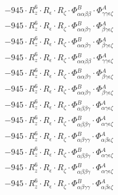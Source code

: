 \documentclass{article}
\begin{document}
\begin{subequations}
\begin{gather}
\begin{array}{c}
 \\[0.2em] 		 - 945 \cdot R_{z}^{6} \cdot R_{\epsilon{}} \cdot R_{\zeta{}} \cdot \Phi{}^{B}_{\alpha{}\alpha{}\beta{}\beta{}} \cdot \Phi{}^{A}_{\gamma{}\gamma{}\epsilon{}\zeta{}} 
 \\[0.2em] 		 - 945 \cdot R_{z}^{6} \cdot R_{\epsilon{}} \cdot R_{\zeta{}} \cdot \Phi{}^{B}_{\alpha{}\alpha{}\beta{}\gamma{}} \cdot \Phi{}^{A}_{\beta{}\gamma{}\epsilon{}\zeta{}} 
 \\[0.2em] 		 - 945 \cdot R_{z}^{6} \cdot R_{\epsilon{}} \cdot R_{\zeta{}} \cdot \Phi{}^{B}_{\alpha{}\alpha{}\beta{}\gamma{}} \cdot \Phi{}^{A}_{\beta{}\gamma{}\epsilon{}\zeta{}} 
 \\[0.2em] 		 - 945 \cdot R_{z}^{6} \cdot R_{\epsilon{}} \cdot R_{\zeta{}} \cdot \Phi{}^{B}_{\alpha{}\alpha{}\beta{}\beta{}} \cdot \Phi{}^{A}_{\gamma{}\gamma{}\epsilon{}\zeta{}} 
 \\[0.2em] 		 - 945 \cdot R_{z}^{6} \cdot R_{\epsilon{}} \cdot R_{\zeta{}} \cdot \Phi{}^{B}_{\alpha{}\alpha{}\beta{}\gamma{}} \cdot \Phi{}^{A}_{\beta{}\gamma{}\epsilon{}\zeta{}} 
 \\[0.2em] 		 - 945 \cdot R_{z}^{6} \cdot R_{\epsilon{}} \cdot R_{\zeta{}} \cdot \Phi{}^{B}_{\alpha{}\alpha{}\beta{}\gamma{}} \cdot \Phi{}^{A}_{\beta{}\gamma{}\epsilon{}\zeta{}} 
 \\[0.2em] 		 - 945 \cdot R_{z}^{6} \cdot R_{\epsilon{}} \cdot R_{\zeta{}} \cdot \Phi{}^{B}_{\alpha{}\beta{}\beta{}\gamma{}} \cdot \Phi{}^{A}_{\alpha{}\gamma{}\epsilon{}\zeta{}} 
 \\[0.2em] 		 - 945 \cdot R_{z}^{6} \cdot R_{\epsilon{}} \cdot R_{\zeta{}} \cdot \Phi{}^{B}_{\alpha{}\beta{}\beta{}\gamma{}} \cdot \Phi{}^{A}_{\alpha{}\gamma{}\epsilon{}\zeta{}} 
 \\[0.2em] 		 - 945 \cdot R_{z}^{6} \cdot R_{\epsilon{}} \cdot R_{\zeta{}} \cdot \Phi{}^{B}_{\alpha{}\beta{}\gamma{}\gamma{}} \cdot \Phi{}^{A}_{\alpha{}\beta{}\epsilon{}\zeta{}} 
 \\[0.2em] 		 - 945 \cdot R_{z}^{6} \cdot R_{\epsilon{}} \cdot R_{\zeta{}} \cdot \Phi{}^{B}_{\alpha{}\beta{}\beta{}\gamma{}} \cdot \Phi{}^{A}_{\alpha{}\gamma{}\epsilon{}\zeta{}} 
 \\[0.2em] 		 - 945 \cdot R_{z}^{6} \cdot R_{\epsilon{}} \cdot R_{\zeta{}} \cdot \Phi{}^{B}_{\alpha{}\beta{}\beta{}\gamma{}} \cdot \Phi{}^{A}_{\alpha{}\gamma{}\epsilon{}\zeta{}} 
 \\[0.2em] 		 - 945 \cdot R_{z}^{6} \cdot R_{\epsilon{}} \cdot R_{\zeta{}} \cdot \Phi{}^{B}_{\alpha{}\beta{}\gamma{}\gamma{}} \cdot \Phi{}^{A}_{\alpha{}\beta{}\epsilon{}\zeta{}} 

\end{array}
\end{gather}
\end{subequations}
\end{document}
